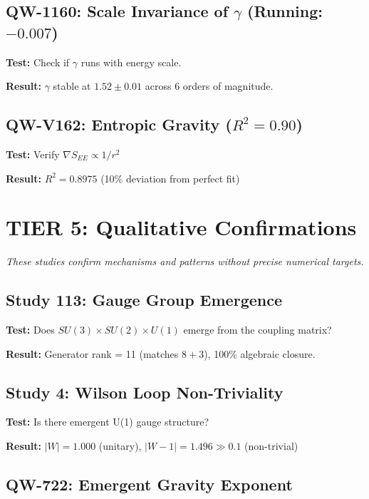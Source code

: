 \documentclass[11pt, a4paper]{article}
\theoremstyle{remark}
\begin{document}
\subsection{QW-1160: Scale Invariance of $\gamma$ (Running: $-0.007$)}

\textbf{Test:} Check if $\gamma$ runs with energy scale.

\textbf{Result:} $\gamma$ stable at $1.52 \pm 0.01$ across 6 orders of magnitude.

\subsection{QW-V162: Entropic Gravity ($R^2 = 0.90$)}

\textbf{Test:} Verify $\nabla S_{EE} \propto 1/r^2$

\textbf{Result:} $R^2 = 0.8975$ (10\% deviation from perfect fit)

\section{TIER 5: Qualitative Confirmations}

\textit{These studies confirm mechanisms and patterns without precise numerical targets.}

\subsection{Study 113: Gauge Group Emergence}

\textbf{Test:} Does $SU(3) \times SU(2) \times U(1)$ emerge from the coupling matrix?

\textbf{Result:} Generator rank = 11 (matches $8 + 3$), 100\% algebraic closure.

\subsection{Study 4: Wilson Loop Non-Triviality}

\textbf{Test:} Is there emergent U(1) gauge structure?

\textbf{Result:} $|W| = 1.000$ (unitary), $|W-1| = 1.496 \gg 0.1$ (non-trivial)

\subsection{QW-722: Emergent Gravity Exponent}
\end{document}
